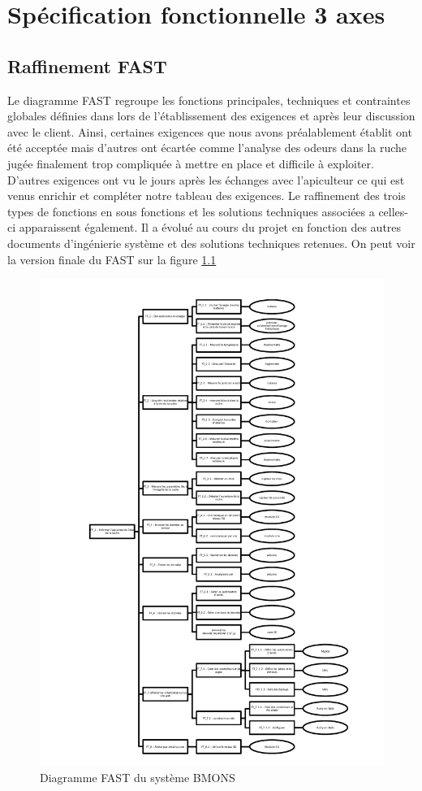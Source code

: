 \chapter{Spécification fonctionnelle  3 axes}

\section{Raffinement FAST}

Le diagramme FAST regroupe les fonctions principales, techniques et contraintes globales définies dans lors de 
l'établissement des exigences et après leur discussion avec le client. Ainsi, certaines exigences que nous avons préalablement établit ont été acceptée mais d'autres ont écartée comme l'analyse des odeurs dans la ruche jugée finalement trop compliquée à mettre en place et difficile à exploiter. D'autres exigences ont vu le jours après les échanges avec l'apiculteur ce qui est venus enrichir et compléter notre tableau des exigences. Le raffinement des trois types de fonctions en sous fonctions et les solutions techniques 
associées a celles-ci apparaissent également. Il a évolué au cours du projet en fonction des autres documents 
d'ingénierie système et des solutions techniques retenues. 
On peut voir la version finale du FAST sur la figure \ref{fig:fast}

\begin{figure}[h!]
\centering\includegraphics[scale=0.8]{FAST_BMONS.pdf}
\caption{\label{fig:fast} Diagramme FAST du système BMONS}
\end{figure}

